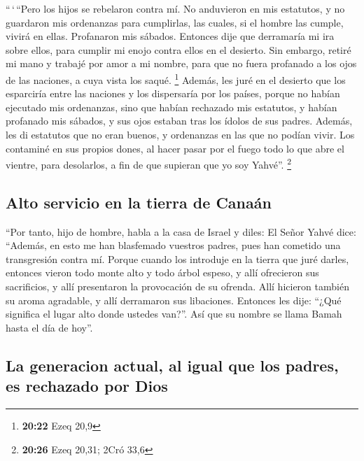 \begin{paracol}{2}
 ``\,`\,``Pero los hijos se rebelaron contra mí. No
anduvieron en mis estatutos, y no guardaron mis ordenanzas para
cumplirlas, las cuales, si el hombre las cumple, vivirá en ellas.
Profanaron mis sábados. Entonces dije que derramaría mi ira sobre ellos,
para cumplir mi enojo contra ellos en el desierto.  Sin
embargo, retiré mi mano y trabajé por amor a mi nombre, para que no
fuera profanado a los ojos de las naciones, a cuya vista los saqué.
\footnote{\textbf{20:22} Ezeq 20,9}  Además, les juré en
el desierto que los esparciría entre las naciones y los dispersaría por
los países,  porque no habían ejecutado mis ordenanzas,
sino que habían rechazado mis estatutos, y habían profanado mis sábados,
y sus ojos estaban tras los ídolos de sus padres. 
Además, les di estatutos que no eran buenos, y ordenanzas en las que no
podían vivir.  Los contaminé en sus propios dones, al
hacer pasar por el fuego todo lo que abre el vientre, para desolarlos, a
fin de que supieran que yo soy Yahvé''. \footnote{\textbf{20:26} Ezeq
  20,31; 2Cró 33,6}

\hypertarget{alto-servicio-en-la-tierra-de-canauxe1n}{%
\subsection{Alto servicio en la tierra de
Canaán}\label{alto-servicio-en-la-tierra-de-canauxe1n}}

 ``Por tanto, hijo de hombre, habla a la casa de Israel y
diles: El Señor Yahvé dice: ``Además, en esto me han blasfemado vuestros
padres, pues han cometido una transgresión contra mí. 
Porque cuando los introduje en la tierra que juré darles, entonces
vieron todo monte alto y todo árbol espeso, y allí ofrecieron sus
sacrificios, y allí presentaron la provocación de su ofrenda. Allí
hicieron también su aroma agradable, y allí derramaron sus libaciones.
 Entonces les dije: ``¿Qué significa el lugar alto donde
ustedes van?''. Así que su nombre se llama Bamah hasta el día de hoy''.

\hypertarget{la-generacion-actual-al-igual-que-los-padres-es-rechazado-por-dios}{%
\subsection{La generacion actual, al igual que los padres, es rechazado
por
Dios}\label{la-generacion-actual-al-igual-que-los-padres-es-rechazado-por-dios}}


\end{paracol}

